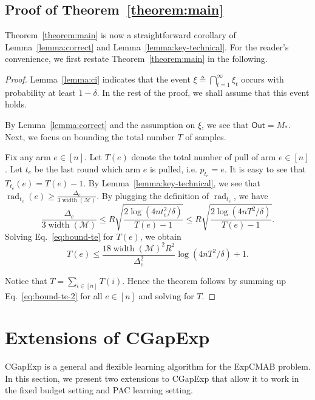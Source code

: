 \documentclass{article}
\newcommand{\Algorithm}{{\small \textsf{CGapExp}}\xspace}
\newcommand{\Problem}{{\small \textsf{ExpCMAB}}\xspace}
\newcommand{\M}{\mathcal M}
\DeclareMathOperator{\rank}{width}
\DeclareMathOperator{\rad}{rad}
\newcommand{\out}{\mathsf{Out}}
\begin{document}
\subsection{Proof of Theorem~\ref{theorem:main}}

Theorem~\ref{theorem:main} is now a straightforward corollary of Lemma~\ref{lemma:correct} and Lemma~\ref{lemma:key-technical}.
For the reader's convenience, we first restate Theorem~\ref{theorem:main} in the following.
\mainresult*

\begin{proof}
Lemma~\ref{lemma:ci} indicates that the event $\xi \triangleq \bigcap_{t=1}^\infty \xi_t$ occurs with probability at least $1-\delta$.
In the rest of the proof, we shall assume that this event holds.

By Lemma~\ref{lemma:correct} and the assumption on $\xi$, we see that $\out=M_*$.
Next, we focus on bounding the total number $T$ of samples.

Fix any arm $e\in [n]$.
Let $T(e)$ denote the total number of pull of arm $e\in [n]$.
Let $t_e$ be the last round which arm $e$ is pulled, i.e. $p_{t_e} = e$. 
It is easy to see that 
$T_{t_e}(e) = T(e) - 1$.
By Lemma~\ref{lemma:key-technical}, we see that 
$\rad_{t_e}(e) \ge \frac{\Delta_e}{3\rank(\M)}$.
By plugging the definition of $\rad_{t_e}$, we have
\begin{equation}
\frac{\Delta_e}{3\rank(\M)} \le 
R\sqrt{\frac{2\log\left(4n t_e^2/\delta\right)}{T(e)-1}} \le
R\sqrt{\frac{2\log\left(4n T^2/\delta\right)}{T(e)-1}}.
\label{eq:bound-te}
\end{equation}
Solving Eq.~\eqref{eq:bound-te} for $T(e)$, we obtain
\begin{equation}
\label{eq:bound-te-2}
T(e) \le \frac{18 \rank(\M)^2 R^2}{\Delta_e^2} \log(4nT^2/\delta)+1.
\end{equation}

Notice that $T=\sum_{i\in[n]} T(i)$. 
Hence the theorem follows by summing up Eq.~\eqref{eq:bound-te-2} for all $e\in [n]$ and solving for $T$.
\end{proof}


\section{Extensions of \Algorithm}
\label{section:extensions}

\Algorithm is a general and flexible learning algorithm for the \Problem problem.
In this section, we present two extensions to \Algorithm that allow it to work in the fixed budget setting and PAC learning setting.
\end{document}
